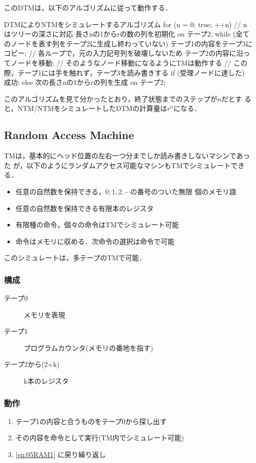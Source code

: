 このDTMは，以下のアルゴリズムに従って動作する．

\begin{mypre}{DTMによりNTMをシミュレートするアルゴリズム}
for (n = 0; true; ++n) {  // nはツリーの深さに対応
  長さnの1からrの数の列を初期化 on テープ2;
  while (全てのノードを表す列をテープ2に生成し終わっていない) {
    テープ1の内容をテープ3にコピー;  // 各ループで，元の入力記号列を破壊しないため
    テープ2の内容に沿ってノードを移動;  // そのようなノード移動になるようにTMは動作する
                                        // この際，テープ1には手を触れず，テープ3を読み書きする
    if (受理ノードに達した) 成功;
    else 次の長さnの1からrの列を生成 on テープ2;
  }
}
\end{mypre}

このアルゴリズムを見て分かったとおり，終了状態までのステップが$n$だとす
ると，NTM/NTMをシミュレートしたDTMの計算量は$r^n$になる．


\subsection{Random Access Machine}
TMは，基本的にヘッド位置の左右一つ分までしか読み書きしないマシンであった
が，以下のようにランダムアクセス可能なマシンもTMでシミュレートできる．
\begin{itemize}
 \item 任意の自然数を保持できる，$0,1,2 , \cdots$の番号のついた無限
       個のメモリ語
 \item 任意の自然数を保持できる有限本のレジスタ
 \item 有限種の命令，個々の命令はTMでシミュレート可能
 \item 命令はメモリに収める．次命令の選択は命令で可能
\end{itemize}
このシミュレートは，多テープのTMで可能．

\subsubsection{構成}
\begin{description}
 \item[テープ0] メモリを表現
 \item[テープ1] プログラムカウンタ(メモリの番地を指す)
 \item[テープ2から(2+k)] k本のレジスタ
\end{description}

\subsubsection{動作}
\begin{enumerate}
 \item テープ1の内容と合うものをテープ0から探し出す \label{en:05RAM1}
 \item その内容を命令として実行(TM内でシミュレート可能)
 \item \ref{en:05RAM1} に戻り繰り返し
\end{enumerate}

